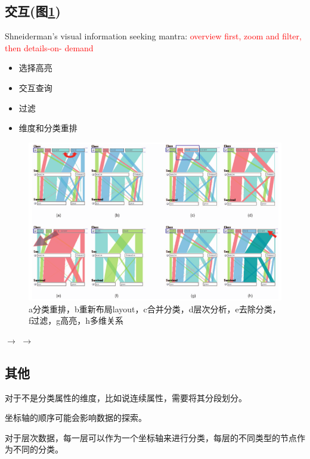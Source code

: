 \documentclass{article}
\begin{document}
	\subsection{交互(图\ref{fig:parallelcoordinates2})}
	\begin{framed}
		Shneiderman’s visual information seeking mantra:
		\textcolor{red}{overview first, zoom and filter, then details-on- demand}
	\end{framed}
	\begin{itemize}
		\item 选择高亮
		\item 交互查询
		\item 过滤
		\item 维度和分类重排
	\end{itemize}
	\begin{figure}[h]
		\centering
		\includegraphics[width=\textwidth]{"_img/Parallel_Coordinates_2.png"}
		\caption{a分类重排，b重新布局layout，c合并分类，d层次分析，e去除分类，f过滤，g高亮，h多维关系}
		\label{fig:parallelcoordinates2}
	\end{figure}

	$\longrightarrow$
  $\longrightarrow$

	\subsection{其他}
	对于不是分类属性的维度，比如说连续属性，需要将其分段划分。

	坐标轴的顺序可能会影响数据的探索。

	对于层次数据，每一层可以作为一个坐标轴来进行分类，每层的不同类型的节点作为不同的分类。
\end{document}
